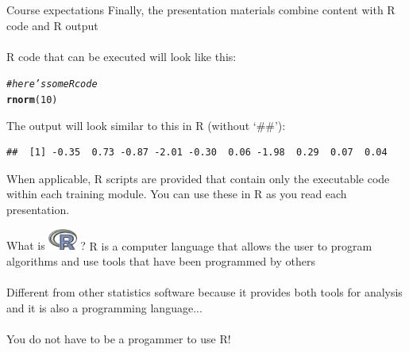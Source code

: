 \documentclass[xcolor=svgnames]{beamer}\usepackage[]{graphicx}\usepackage[]{color}
\makeatletter
\newcommand{\hlnum}[1]{\textcolor[rgb]{0.686,0.059,0.569}{#1}}%
\newcommand{\hlcom}[1]{\textcolor[rgb]{0.678,0.584,0.686}{\textit{#1}}}%
\newcommand{\hlstd}[1]{\textcolor[rgb]{0.345,0.345,0.345}{#1}}%
\newcommand{\hlkwd}[1]{\textcolor[rgb]{0.737,0.353,0.396}{\textbf{#1}}}%
\newenvironment{kframe}{%
 \def\at@end@of@kframe{}%
 \ifinner\ifhmode%
  \def\at@end@of@kframe{\end{minipage}}%
  \begin{minipage}{\columnwidth}%
 \fi\fi%
 \def\FrameCommand##1{\hskip\@totalleftmargin \hskip-\fboxsep
 \colorbox{shadecolor}{##1}\hskip-\fboxsep
     \hskip-\linewidth \hskip-\@totalleftmargin \hskip\columnwidth}%
 \MakeFramed {\advance\hsize-\width
   \@totalleftmargin\z@ \linewidth\hsize
   \@setminipage}}%
 {\par\unskip\endMakeFramed%
 \at@end@of@kframe}
\newenvironment{knitrout}{}{} %
\makeatother
\begin{document}
\begin{frame}[containsverbatim]{Course expectations}
Finally, the presentation materials combine content with R code and R output\\~\\
R code that can be executed will look like this:
\begin{knitrout}\scriptsize
{}\color{fgcolor}\begin{kframe}
\begin{alltt}
\hlcom{# here's some R code}
\hlkwd{rnorm}\hlstd{(}\hlnum{10}\hlstd{)}
\end{alltt}
\end{kframe}
\end{knitrout}
The output will look similar to this in R (without `\#\#'):
\begin{knitrout}\scriptsize
{}\color{fgcolor}\begin{kframe}
\begin{verbatim}
##  [1] -0.35  0.73 -0.87 -2.01 -0.30  0.06 -1.98  0.29  0.07  0.04
\end{verbatim}
\end{kframe}
\end{knitrout}
When applicable, R scripts are provided that contain only the executable code within each training module.  You can use these in R as you read each presentation.
\end{frame}

\begin{frame}{What is \includegraphics[width=0.07\textwidth]{Rlogo.jpg} \hspace{0.2em}? }
R is a computer language that allows the user to program algorithms and use tools that have been programmed by others\\~\\
Different from other statistics software because it provides both tools for analysis and it is also a programming language...\\~\\
You do not have to be a progammer to use R!
\end{frame}
\end{document}
